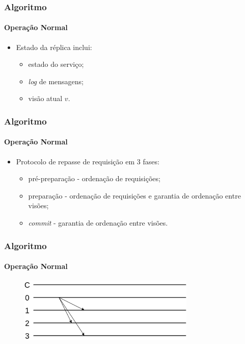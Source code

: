 \documentclass{beamer}
\begin{document}
\begin{frame}
  \frametitle{Algoritmo}
  \framesubtitle{Operação Normal}

  \begin{itemize}
    \item
      Estado da réplica inclui:
      \begin{itemize}
        \item
          estado do serviço;

        \item
          \textit{log} de mensagens;

        \item
          visão atual $v$.
      \end{itemize}
  \end{itemize}
\end{frame}

\begin{frame}
  \frametitle{Algoritmo}
  \framesubtitle{Operação Normal}

  \begin{itemize}
    \item
      Protocolo de repasse de requisição em 3 fases:
      \begin{itemize}
        \item
          pré-preparação - ordenação de requisições;

        \item
          preparação - ordenação de requisições e garantia de ordenação entre visões;

        \item
          \textit{commit} - garantia de ordenação entre visões.
      \end{itemize}
  \end{itemize}
\end{frame}

\begin{frame}
  \frametitle{Algoritmo}
  \framesubtitle{Operação Normal}

  \begin{figure}
    \includegraphics[width=0.75\textwidth]{images/preprepare}
  \end{figure}
\end{frame}
\end{document}
